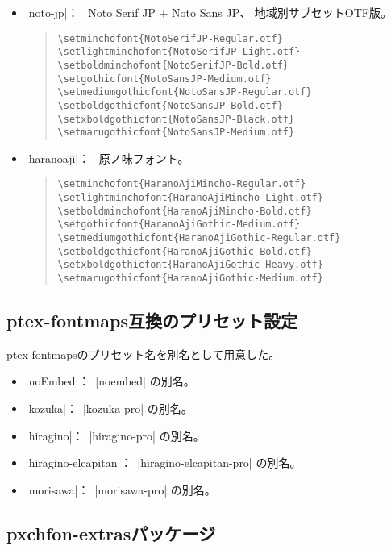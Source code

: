 \documentclass[uplatex,dvipdfmx,a4paper]{jsarticle}
\newcommand{\Pkg}[1]{\textsf{#1}}
\newcommand{\Means}{：\ }
\begin{document}
\begin{itemize}
\item |noto-jp|\Means
  Noto Serif JP + Noto Sans JP、
  地域別サブセットOTF版。

\begin{quote}\small\begin{verbatim}
\setminchofont{NotoSerifJP-Regular.otf}
\setlightminchofont{NotoSerifJP-Light.otf}
\setboldminchofont{NotoSerifJP-Bold.otf}
\setgothicfont{NotoSansJP-Medium.otf}
\setmediumgothicfont{NotoSansJP-Regular.otf}
\setboldgothicfont{NotoSansJP-Bold.otf}
\setxboldgothicfont{NotoSansJP-Black.otf}
\setmarugothicfont{NotoSansJP-Medium.otf}
\end{verbatim}\end{quote}

\item |haranoaji|\Means
  原ノ味フォント。

\begin{quote}\small\begin{verbatim}
\setminchofont{HaranoAjiMincho-Regular.otf}
\setlightminchofont{HaranoAjiMincho-Light.otf}
\setboldminchofont{HaranoAjiMincho-Bold.otf}
\setgothicfont{HaranoAjiGothic-Medium.otf}
\setmediumgothicfont{HaranoAjiGothic-Regular.otf}
\setboldgothicfont{HaranoAjiGothic-Bold.otf}
\setxboldgothicfont{HaranoAjiGothic-Heavy.otf}
\setmarugothicfont{HaranoAjiGothic-Medium.otf}
\end{verbatim}\end{quote}

\end{itemize}

\subsection{ptex-fontmaps互換のプリセット設定}

\Pkg{ptex-fontmaps}のプリセット名を別名として用意した。

\begin{itemize}
\item |noEmbed|\Means |noembed| の別名。
\item |kozuka|\Means |kozuka-pro| の別名。
\item |hiragino|\Means |hiragino-pro| の別名。
\item |hiragino-elcapitan|\Means |hiragino-elcapitan-pro| の別名。
\item |morisawa|\Means |morisawa-pro| の別名。
\end{itemize}

\subsection{pxchfon-extrasパッケージ}
\label{ssec:Package-pxchfon-extras}
\end{document}
